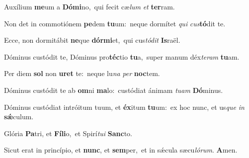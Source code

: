 \vs Auxílium \textbf{me}um a \textbf{Dó}\textbf{mi}no,~\redgreheightstar qui fecit cæ\textit{lum} \textit{et} \textbf{ter}ram.

\vs Non det in commotiónem \textbf{pe}dem \textbf{tu}\-um:~\redgreheightstar neque dormítet \textit{qui} \textit{cus}\textbf{tó}dit te.

\vs Ecce, non dormitábit \textbf{ne}que \textbf{dór}\-\textbf{mi}\-et,~\redgreheightstar qui cus\textit{tó}\textit{dit} \textbf{Is}raël.

\vs Dóminus custódit te, Dóminus pro\-\textbf{téc}\-tio \textbf{tu}a,~\redgreheightstar super manum déx\textit{te}\textit{ram} \textbf{tu}am.

\vs Per diem \textbf{sol} non \textbf{u}\textbf{ret} te:~\redgreheightstar neque lu\textit{na} \textit{per} \textbf{noc}tem.

\vs Dóminus custódit te ab \textbf{om}ni \textbf{ma}lo:~\redgreheightstar custódiat ánimam \textit{tu}\textit{am} \textbf{Dó}\-mi\-nus.

\vs Dóminus custódiat intróitum tuum, et \textbf{éx}itum \textbf{tu}um:~\redgreheightstar ex hoc nunc, et us\textit{que} \textit{in} \textbf{sǽ}culum.

\vs Glória \textbf{Pa}tri, et \textbf{Fí}\textbf{li}o,~\redgreheightstar et Spirí\textit{tu}\textit{i} \textbf{Sanc}to.

\vs Sicut erat in princípio, et \textbf{nunc}, et \textbf{sem}per,~\redgreheightstar et in sǽcula sæcu\textit{ló}\textit{rum}. \textbf{A}men.

